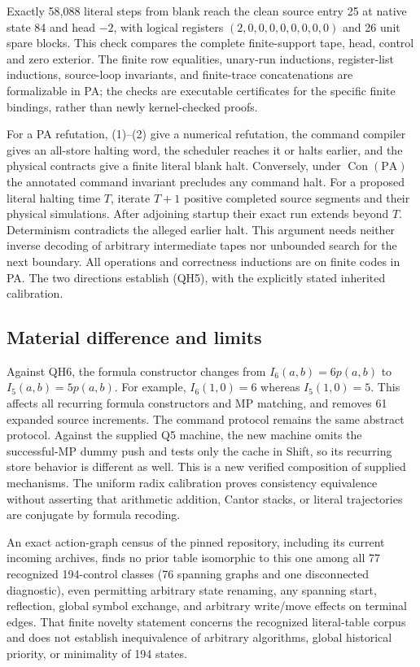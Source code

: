Exactly 58,088 literal steps from blank reach the clean source entry
25 at native state 84 and head $-2$, with logical registers
$(2,0,0,0,0,0,0,0,0)$ and 26 unit spare blocks. This check compares
the complete finite-support tape, head, control and zero exterior.
The finite row equalities, unary-run inductions, register-list
inductions, source-loop invariants, and finite-trace concatenations
are formalizable in PA; the checks are executable certificates for
the specific finite bindings, rather than newly kernel-checked proofs.

For a PA refutation, (1)--(2) give a numerical refutation, the command
compiler gives an all-store halting word, the scheduler reaches it or
halts earlier, and the physical contracts give a finite literal blank
halt. Conversely, under $\operatorname{Con}(\mathrm{PA})$ the annotated
command invariant precludes any command halt. For a proposed literal
halting time $T$, iterate $T+1$ positive completed source segments and
their physical simulations. After adjoining startup their exact run
extends beyond $T$. Determinism contradicts the alleged earlier halt.
This argument needs neither inverse decoding of arbitrary intermediate
tapes nor unbounded search for the next boundary. All operations and
correctness inductions are on finite codes in PA. The two directions
establish (QH5), with the explicitly stated inherited calibration.

\subsection{Material difference and limits}

Against QH6, the formula constructor changes from $I_6(a,b)=6p(a,b)$
to $I_5(a,b)=5p(a,b)$. For example, $I_6(1,0)=6$ whereas
$I_5(1,0)=5$. This affects all recurring formula constructors and MP
matching, and removes 61 expanded source increments. The command protocol
remains the same abstract protocol. Against the supplied Q5 machine,
the new machine omits the successful-MP dummy push and tests only the
cache in Shift, so its recurring store behavior is different as well.
This is a new verified composition of supplied mechanisms. The uniform
radix calibration proves consistency equivalence without asserting that
arithmetic addition, Cantor stacks, or literal trajectories are conjugate
by formula recoding.

An exact action-graph census of the pinned repository, including its
current incoming archives, finds no prior table isomorphic to this one among all 77 recognized
194-control classes (76 spanning graphs and one disconnected diagnostic),
even permitting arbitrary state renaming, any spanning start, reflection,
global symbol exchange, and arbitrary write/move effects on terminal edges. That finite novelty statement concerns
the recognized literal-table corpus and does not establish inequivalence
of arbitrary algorithms, global historical priority, or minimality of
194 states.
